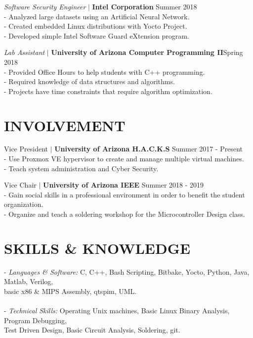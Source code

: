 \documentclass[line, 12pt]{res}
\newcommand\tab[1][0.5cm]{\hspace*{#1}}
\begin{document}
\begin{resume}
				{\sl Software Security Engineer} $\mid$ \textbf{Intel Corporation} \hfill Summer 2018 \\
                \tab - Analyzed large datasets using an Artificial Neural Network. \\
                \tab - Created embedded Linux distributions with Yocto Project.\\
                \tab - Developed simple Intel Software Guard eXtension program.
 		
 
                {\sl Lab Assistant} $\mid$ \textbf{University of Arizona Computer Programming II}\hfill Spring 2018 \\
                 	\tab - Provided Office Hours to help students with C++ programming. \\
                 	\tab - Required knowledge of data structures and algorithms. \\
                 	\tab - Projects have time constraints that require algorithm optimization.
				
				
				

\section{INVOLVEMENT} 
	Vice President $\mid$ \textbf{University of Arizona H.A.C.K.S} \hfill Summer 2017 - Present \\
	\tab - Use Proxmox VE hypervisor to create and manage multiple virtual machines. \\
	\tab - Teach system administration and Cyber Security.

	Vice Chair $\mid$ \textbf{University of Arizona IEEE} \hfill Summer 2018 - 2019 \\
		\tab - Gain social skills in a professional environment in order to benefit the student organization. \\
		\tab - Organize and teach a soldering workshop for the Microcontroller Design class.
	

\section{SKILLS \& KNOWLEDGE} 
	- {\sl Languages \& Software:} C, C++, Bash Scripting, Bitbake, Yocto, Python, Java, Matlab, Verilog, \\ \tab[4.48cm] basic x86 \& MIPS Assembly, qtspim, UML. \\ \\
	- {\sl Technical Skills:} Operating Unix machines, Basic Linux Binary Analysis, Program Debugging, \\ \tab[3.25cm] Test Driven Design, Basic Circuit Analysis, Soldering, git.
 

\end{resume}
\end{document}
